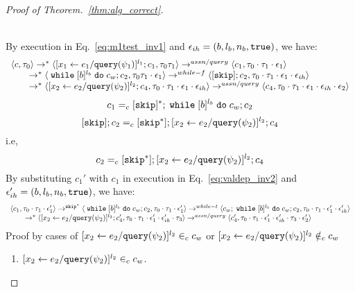 \begin{proof}[Proof of Theorem.~\ref{thm:alg_correct}]
\begin{case}
\begin{subcase}
\begin{subsubcase}
\begin{subsubsubcase}
\begin{subproof}
\\
By execution in Eq.~\ref{eq:m1test_inv1} and $\mathtt{\epsilon}_{ih} = (b, l_b, n_b, \mathtt{true})$, we have:
\[
  \begin{array}{l}   
  \langle {c}, \mathtt{\tau}_0 \rangle \rightarrow^{*} 
  \langle [\mathrel{ {x}_1 \leftarrow e_1 / {\tt query}(\psi_1) }]^{l_1} ; {c}_1, \mathtt{\tau}_0 \mathtt{\tau}_1 \rangle  
  \rightarrow^{assn/query}
  \langle c_1, \mathtt{\tau}_0 \cdot \mathtt{\tau}_1 \cdot \mathtt{\epsilon}_1 \rangle 
  \\
  \qquad \rightarrow^{*} 
  \langle \;\mathtt{while}\; [b]^{l_b} \;\mathtt{do}\; c_w;{c}_2, 
  \mathtt{\tau}_0 \mathtt{\tau}_1 \cdot \mathtt{\epsilon}_1 \rangle 
  \rightarrow^{while-f} 
  \langle [\mathtt{skip}]; c_2, \mathtt{\tau}_0 \cdot \mathtt{\tau}_1 \cdot \mathtt{\epsilon}_1 \cdot \mathtt{\epsilon}_{ih} \rangle 
  \\
  \qquad \rightarrow^{*} 
  \langle [\mathrel{ {x}_2 \leftarrow e_2 / {\tt query}(\psi_2) }]^{l_2};{c}_4, 
  \mathtt{\tau}_0 \cdot \mathtt{\tau}_1 \cdot \mathtt{\epsilon}_1 \cdot \mathtt{\epsilon}_{ih} \rangle 
  \rightarrow^{assn/query} 
  \langle {c}_4,  \mathtt{\tau}_0 \cdot \mathtt{\tau}_1 \cdot \mathtt{\epsilon}_1 \cdot \mathtt{\epsilon}_{ih} \cdot \mathtt{\epsilon}_2 \rangle 
  \end{array}
\]
%
\[
  c_1 =_c [\mathtt{skip}]{}^*; \;\mathtt{while}\; [b]^{l_b} \;\mathtt{do}\; c_w;{c}_2
\]
% 
\[
  [\mathtt{skip}]; c_2 =_c [\mathtt{skip}^*];[\mathrel{ {x}_2 \leftarrow e_2 / {\tt query}(\psi_2) }]^{l_2};{c}_4
\]
i.e,
\[
  c_2 =_c [\mathtt{skip}^*];[\mathrel{ {x}_2 \leftarrow e_2 / {\tt query}(\psi_2) }]^{l_2};{c}_4
\]
%
By substituting $c_1'$ with $c_1$ in execution in Eq.~\ref{eq:valdep_inv2} and $\mathtt{\epsilon}_{ih}' = (b, l_b, n_b, \mathtt{true})$, we have:
  \begin{equation}
  \label{eq:m1testwhile_inv2}
  \begin{array}{l}   
  \langle c_1, \mathtt{\tau}_0 \cdot \mathtt{\tau}_1 \cdot \mathtt{\epsilon}_1' \rangle 
  \rightarrow^{\mathtt{skip}^*} 
  \langle \;\mathtt{while}\; [b]^{l_b} \;\mathtt{do}\; c_w;{c}_2, \mathtt{\tau}_0 \cdot \mathtt{\tau}_1 \cdot \mathtt{\epsilon}_1' \rangle 
  \rightarrow^{while-t} 
  \langle c_w;\;\mathtt{while}\; [b]^{l_b} \;\mathtt{do}\; c_w;c_2, \mathtt{\tau}_0 \cdot \mathtt{\tau}_1 \cdot \mathtt{\epsilon}_1' \cdot \mathtt{\epsilon}_{ih}' \rangle 
  \\
  \qquad \rightarrow^{*} 
  \langle [\mathrel{ {x}_2 \leftarrow e_2 / {\tt query}(\psi_2) }]^{l_2};{c}_4', 
  \mathtt{\tau}_0 \cdot \mathtt{\tau}_1 \cdot \mathtt{\epsilon}_1' \cdot \mathtt{\epsilon}_{ih}' \cdot \mathtt{\tau}_3 \rangle
  \rightarrow^{assn/query} 
  \langle {c}_4',  \mathtt{\tau}_0 \cdot \mathtt{\tau}_1 \cdot \mathtt{\epsilon}_1' \cdot \mathtt{\epsilon}_{ih}' \cdot \mathtt{\tau}_3 \cdot \mathtt{\epsilon}_2' \rangle 
\end{array}
\end{equation}
%
Proof by cases of $[\mathrel{ {x}_2 \leftarrow e_2 / {\tt query}(\psi_2) }]^{l_2} \in_c c_w$ or 
$[\mathrel{ {x}_2 \leftarrow e_2 / {\tt query}(\psi_2) }]^{l_2} \notin_c c_w$
\begin{enumerate}
  \item $[\mathrel{ {x}_2 \leftarrow e_2 / {\tt query}(\psi_2) }]^{l_2} \in_c c_w$.

\end{enumerate}
\end{subproof}
\end{subsubsubcase}
\end{subsubcase}
\end{subcase}
\end{case}
\end{proof}
